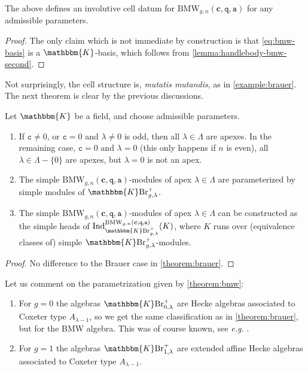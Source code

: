\documentclass[a4paper,11pt]{amsart}
\newcommand{\eg}{\textsl{e.g.}}
\newcommand{\muta}{\textsl{mutatis mutandis}}
\newcommand{\setstuff}[1]{\mathrm{#1}}
\newcommand{\KK}{\mathbbm{K}}
\newcommand{\bsym}[1]{\boldsymbol{#1}}
\newcommand{\varsym}[1]{\mathtt{#1}}
\newcommand{\qvar}{\varsym{q}}
\newcommand{\cpar}{\bsym{c}}
\newcommand{\cvar}{\varsym{c}}
\newcommand{\avar}{\varsym{a}}
\numberwithin{equation}{section}
\let\fullref\autoref
\begin{document}
\begin{proposition}\label{proposition:bmw-basis}
The above defines an involutive 
cell datum for $\setstuff{BMW}_{g,n}(\cpar,\qvar,\avar)$ 
for any admissible parameters.
\end{proposition}

\begin{proof}
The only claim which is not immediate by construction is 
that \eqref{eq:bmw-basis} is a $\KK$-basis, which
follows from \fullref{lemma:handlebody-bmw-second}.
\end{proof}

Not surprisingly, the cell 
structure is, {\muta}, as in \fullref{example:brauer}.
The next theorem is 
clear by the previous discussions.

\begin{theorem}\label{theorem:bmw}
Let $\KK$ be a field, and choose admissible parameters.
\begin{enumerate}

\item If $\cvar\neq 0$, or $\cvar=0$ and $\lambda\neq 0$ is odd, 
then all $\lambda\in\Lambda$ are apexes. In the remaining case, 
$\cvar=0$ and $\lambda=0$ (this only happens if $n$ is even), all $\lambda\in\Lambda-\{0\}$ are apexes, but $\lambda=0$ is not an apex.

\item The simple $\setstuff{BMW}_{g,n}(\cpar,\qvar,\avar)$-modules of 
apex $\lambda\in\Lambda$ 
are parameterized by simple modules of $\KK\setstuff{Br}_{g,\lambda}^{+}$.

\item The simple $\setstuff{BMW}_{g,n}(\cpar,\qvar,\avar)$-modules of 
apex $\lambda\in\Lambda$ can be constructed as 
the simple heads of
$\mathrm{Ind}_{\KK\setstuff{Br}_{g,\lambda}^{+}}^{\setstuff{BMW}_{g,n}(\cpar,\qvar,\avar)}(K)$, 
where $K$ runs over (equivalence classes of) 
simple $\KK\setstuff{Br}_{g,\lambda}^{+}$-modules.

\end{enumerate}
\end{theorem}

\begin{proof}
No difference to the Brauer case in \fullref{theorem:brauer}.
\end{proof}

\begin{example}
Let us comment on the parametrization given by 
\fullref{theorem:bmw}:
\begin{enumerate}

\item For $g=0$ the algebras $\KK\setstuff{Br}_{0,\lambda}^{+}$ 
are Hecke algebras associated to Coxeter type 
$A_{\lambda-1}$, so we get the same classification 
as in \fullref{theorem:brauer}, but for the BMW algebra. 
This was of course known, see {\eg} \cite[Corollary 3.14]{Xi-bmw}.

\item For $g=1$ the algebras $\KK\setstuff{Br}_{1,\lambda}^{+}$
are extended affine Hecke algebras associated to Coxeter type 
$A_{\lambda-1}$.

\end{enumerate}
\end{example}
\end{document}
